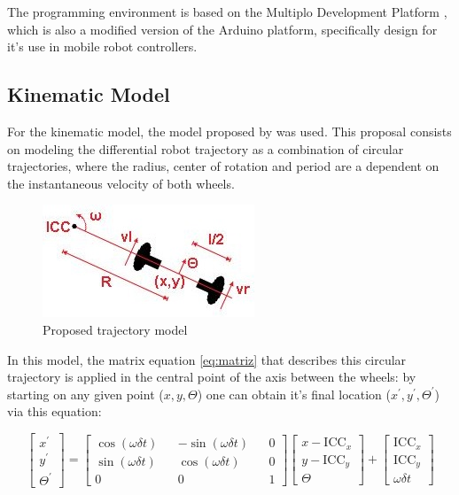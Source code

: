 \documentclass[a4paper]{aadeca}
\begin{document}
The programming environment is based on the Multiplo Development Platform \cite{duinobot_multiplo_2016}, which is also a modified version of the Arduino platform, specifically design for it's use in mobile robot controllers.

\subsection{Kinematic Model}

For the kinematic model, the model proposed by \cite{dudek_computational_2010} was used.
This proposal consists on modeling the differential robot trajectory as a combination of circular trajectories, where the radius, center of rotation and period are a dependent on the instantaneous velocity of both wheels.

\begin{figure}[h]
\centering
\includegraphics[width=0.6\linewidth]{./parametros}
\caption{Proposed trajectory model}
\label{fig:parametros}
\end{figure}

In this model, the matrix equation \eqref{eq:matriz} that describes this circular trajectory is applied in the central point of the axis between the wheels: by starting on any given point ($x,y,\Theta$) one can obtain it's final location ($x^{'},y^{'},\Theta^{'}$) via this equation:

\small
\begin{equation}
\label{eq:matriz}
\begin{bmatrix}
x^{'}\\
y^{'}\\
\Theta^{'}
\end{bmatrix}=
\begin{bmatrix}
\cos\left(\omega\delta t\right) && -\sin\left(\omega\delta t\right) && 0\\
\sin\left(\omega\delta t\right) && \cos\left(\omega\delta t\right) && 0\\
0 && 0 && 1
\end{bmatrix}
\begin{bmatrix}
x-\text{ICC}_x\\
y-\text{ICC}_y\\
\Theta
\end{bmatrix}+
\begin{bmatrix}
\text{ICC}_x\\
\text{ICC}_y\\
\omega\delta t
\end{bmatrix}
\end{equation}
\normalsize
\end{document}
